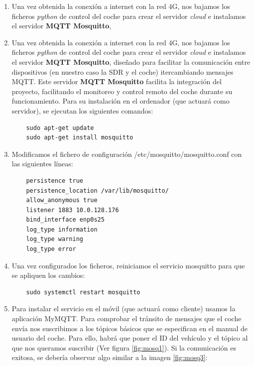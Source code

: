 \begin{enumerate}
\item Una vez obtenida la conexión a internet con la red 4G, nos bajamos los ficheros \textit{python} de control del coche para crear el servidor \textit{cloud} e instalamos el servidor \textbf{MQTT Mosquitto}, \item Una vez obtenida la conexión a internet con la red 4G, nos bajamos los ficheros \textit{python} de control del coche para crear el servidor \textit{cloud} e instalamos el servidor \textbf{MQTT Mosquitto}, diseñado para facilitar la comunicación entre dispositivos (en nuestro caso la SDR y el coche) itercambiando mensajes MQTT. Este servidor \textbf{MQTT Mosquitto} facilita la integración del proyecto, facilitando el monitoreo y control remoto del coche durante su funcionamiento.
Para su instalación en el ordenador (que actuará como servidor), se ejecutan los siguientes comandos:

\begin{lstlisting}
	sudo apt-get update
	sudo apt-get install mosquitto
\end{lstlisting}

\item Modificamos el fichero de configuración /etc/mosquitto/mosquitto.conf con las siguientes líneas:
\begin{lstlisting}
	persistence true
	persistence_location /var/lib/mosquitto/
	allow_anonymous true
	listener 1883 10.0.128.176
	bind_interface enp0s25
	log_type information
	log_type warning
	log_type error
\end{lstlisting}

\item Una vez configurados los ficheros, reiniciamos el servicio mosquitto para que se apliquen los cambios:
\begin{lstlisting}
	sudo systemctl restart mosquitto
\end{lstlisting}

\item Para instalar el servicio en el móvil (que actuará como cliente) usamos la aplicación MyMQTT. Para comprobar el tránsito de mensajes que el coche envía nos suscribimos a los tópicos básicos que se especifican en el manual de usuario del coche. Para ello, habrá que poner el ID del vehículo y el tópico al que nos queramos suscribir (Ver figura \ref{fig:mosq1}). Si la comunicación es exitosa, se debería observar algo similar a la imagen \ref{fig:mosq3}:


\end{enumerate}
